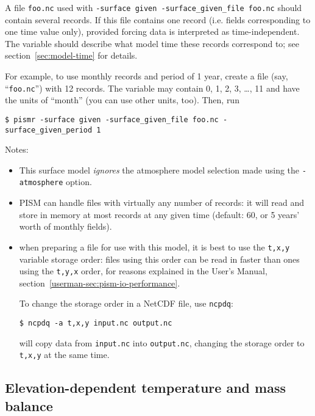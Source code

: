 \documentclass[titlepage,letterpaper,final]{scrartcl}
\begin{document}
A file \texttt{foo.nc} used with \texttt{-surface given -surface_given_file
  foo.nc} should contain several records. If this file contains one record
(i.e. fields corresponding to one time value only), provided forcing data is
interpreted as time-independent. The  variable should describe
what model time these records correspond to; see section~\ref{sec:model-time}
for details.

For example, to use monthly records and period of 1 year, create a file (say,
``\texttt{foo.nc}'') with 12 records. The  variable may contain
0, 1, 2, 3, \dots, 11 and have the units of ``month'' (you can use other units,
too). Then, run
\begin{verbatim}
$ pismr -surface given -surface_given_file foo.nc -surface_given_period 1
\end{verbatim}%

\noindent Notes:
\begin{itemize}
\item This surface model \emph{ignores} the atmosphere model selection made
  using the \texttt{-atmosphere} option.
\item PISM can handle files with virtually any number of records: it will
  read and store in memory at most  records
  at any given time (default: 60, or 5 years' worth of monthly fields).
\item when preparing a file for use with this model, it is best to use the
  \texttt{t,x,y} variable storage order: files using this order can be read in
  faster than ones using the \texttt{t,y,x} order, for reasons explained in the
  User's Manual, section~\ref*{userman-sec:pism-io-performance}.

  To change the storage order in a NetCDF file, use \texttt{ncpdq}:
\begin{verbatim}
$ ncpdq -a t,x,y input.nc output.nc
\end{verbatim}%
  will copy data from \texttt{input.nc} into \texttt{output.nc}, changing the
  storage order to \texttt{t,x,y} at the same time.
\end{itemize}

\subsection{Elevation-dependent temperature and mass balance}
\label{sec:surface-elevation}

\newcommand{\var}[2]{ {#1}_{\text{#2}} }
\newcommand{\h}[1]{ \var{h}{#1} }
\newcommand{\T}[1]{ \var{T}{#1} }
\newcommand{\m}[1]{ \var{m}{#1} }
\newcommand{\ms}[1]{ \var{m^{*}}{#1} }
\newcommand{\diff}[2]{ \frac{\mathrm{d}#1}{\mathrm{d}#2} }
\end{document}
